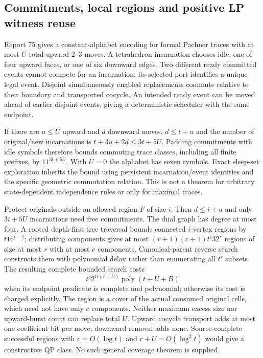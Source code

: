 \subsection{Commitments, local regions and positive LP witness reuse}

Report 75 gives a constant-alphabet encoding for formal Pachner traces with
at most $U$ total upward $2$--$3$ moves. A tetrahedron incarnation chooses
idle, one of four upward faces, or one of six downward edges. Two different
ready committed events cannot compete for an incarnation: its selected
port identifies a unique legal event. Disjoint simultaneously enabled
replacements commute relative to their boundary and transported cocycle.
An intended ready event can be moved ahead of earlier disjoint events,
giving a deterministic scheduler with the same endpoint.

If there are $u\le U$ upward and $d$ downward moves, $d\le t+u$ and the
number of original/new incarnations is
$t+3u+2d\le3t+5U$. Padding commitments with idle symbols therefore bounds
commuting trace classes, including all finite prefixes, by $11^{3t+5U}$.
With $U=0$ the alphabet has seven symbols. Exact sleep-set exploration
inherits the bound using persistent incarnation/event identities and the
specific geometric commutation relation. This is not a theorem for arbitrary
state-dependent independence rules or only for maximal traces.

Protect originals outside an allowed region $F$ of size $i$. Then
$d\le i+u$ and only $3i+5U$ incarnations need free commitments. The dual
graph has degree at most four. A rooted depth-first tree traversal bounds
connected $i$-vertex regions by $t16^{i-1}$; distributing components gives
at most $(r+1)(c+1)t^c32^r$ regions of size at most $r$ with at most $c$
components. Canonical-parent reverse search constructs them with polynomial
delay rather than enumerating all $t^r$ subsets. The resulting complete
bounded search costs
\[
 t^c2^{O(r+U)}\operatorname{poly}(t+U+B)
\]
when its endpoint predicate is complete and polynomial; otherwise its cost
is charged explicitly. The region is a cover of the actual consumed
original cells, which need not have only $c$ components. Neither maximum
excess size nor upward-burst count can replace total $U$. Upward cocycle
transport adds at most one coefficient bit per move; downward removal adds
none. Source-complete successful regions with $c=O(\log t)$ and
$r+U=O(\log^2t)$ would give a constructive QP class. No such general coverage
theorem is supplied.

